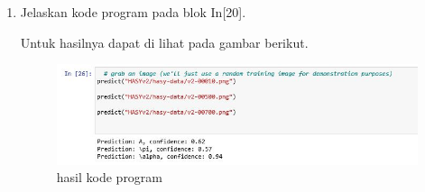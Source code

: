 \begin{enumerate}
\item Jelaskan kode program pada blok  In[20].

Untuk hasilnya dapat di lihat pada gambar berikut.
\begin{figure}[ht]
\centering
\includegraphics[scale=0.4]{figures/1174042/chapter7/2,20.JPG}
\caption{hasil kode program}
\label{Contoh}
\end{figure}

\end{enumerate}